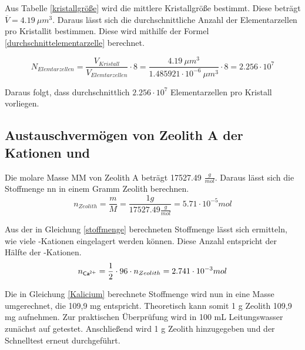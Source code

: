 \documentclass[12pt, a4paper]{article}
\begin{document}
\noindent 
Aus Tabelle \ref{kristallgröße} wird die mittlere Kristallgröße bestimmt. Diese beträgt $\overline{V} = 4.19 \: \mu m^3$.
Daraus lässt sich die durchschnittliche Anzahl der Elementarzellen pro Kristallit bestimmen. Diese wird mithilfe der Formel \ref{durchschnittelementarzelle} berechnet.

\begin{equation}
  N_{Elemtarzellen} = \frac{V_{Kristall}}{V_{Elemtarzellen}} \cdot 8 = \frac{4.19 \: \mu m^3 }{1.485921 \cdot 10^{-6} \: \mu m^3} \cdot 8 =2.256 \cdot 10^{7}
  \label{durchschnittelementarzelle}
\end{equation}

\noindent
Daraus folgt, dass durchschnittlich $2.256 \cdot 10^7$ Elementarzellen pro Kristall vorliegen.






\subsection{\texorpdfstring{Austauschvermögen von Zeolith A der Kationen  und }{Austauschvermögen von Zeolith A der Kationen Ca2+ und Na+}}
Die molare Masse MM von Zeolith A beträgt 17527.49 $\frac{g}{mol}$. Daraus lässt sich die Stoffmenge nn in einem Gramm Zeolith berechnen.
\begin{equation}
  n_{Zeolith}=\frac{m}{M}=\frac{1 g}{17527.49 \frac{g}{mol}}=5.71 \cdot 10^{-5} mol
  \label{stoffmenge}
\end{equation}

\noindent
Aus der in Gleichung \ref{stoffmenge} berechneten Stoffmenge lässt sich ermitteln, wie viele -Kationen eingelagert werden können. Diese Anzahl entspricht der Hälfte der -Kationen.
\begin{equation}
  n_{\ce{Ca^2+}}=\frac{1}{2} \cdot 96 \cdot n_{Zeolith}=2.741 \cdot 10^{-3} mol
  \label{Kalicium}
\end{equation}

\noindent
Die in Gleichung \ref{Kalicium} berechnete Stoffmenge wird nun in eine Masse umgerechnet, die 109,9 mg  entspricht. Theoretisch kann somit 1 g Zeolith 109,9 mg  aufnehmen.
Zur praktischen Überprüfung wird in 100 mL Leitungswasser zunächst auf  getestet. Anschließend wird 1 g Zeolith hinzugegeben und der Schnelltest erneut durchgeführt.
\newpage
\end{document}
